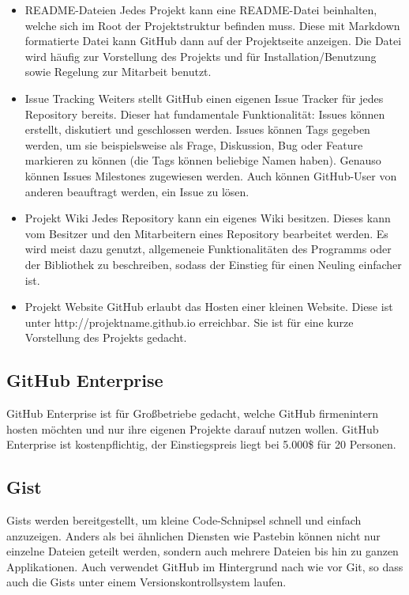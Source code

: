 \begin{itemize}
\item README-Dateien
Jedes Projekt kann eine README-Datei beinhalten, welche sich im Root der Projektstruktur befinden muss. Diese mit Markdown formatierte Datei kann GitHub dann auf der Projektseite anzeigen. Die Datei wird häufig zur Vorstellung des Projekts und für Installation/Benutzung sowie Regelung zur Mitarbeit benutzt.

\item Issue Tracking
Weiters stellt GitHub einen eigenen Issue Tracker für jedes Repository bereits. Dieser hat fundamentale Funktionalität: Issues können erstellt, diskutiert und geschlossen werden. Issues können Tags gegeben werden, um sie beispielsweise als Frage, Diskussion, Bug oder Feature markieren zu können (die Tags können beliebige Namen haben). Genauso können Issues Milestones zugewiesen werden. Auch können GitHub-User von anderen beauftragt werden, ein Issue zu lösen.

\item Projekt Wiki
Jedes Repository kann ein eigenes Wiki besitzen. Dieses kann vom Besitzer und den Mitarbeitern eines Repository bearbeitet werden. Es wird meist dazu genutzt, allgemeneie Funktionalitäten des Programms oder der Bibliothek zu beschreiben, sodass der Einstieg für einen Neuling einfacher ist.

\item Projekt Website
GitHub erlaubt das Hosten einer kleinen Website. Diese ist unter http://projektname.github.io erreichbar. Sie ist für eine kurze Vorstellung des Projekts gedacht.

\end{itemize}

\subsection{GitHub Enterprise}
GitHub Enterprise ist für Großbetriebe gedacht, welche GitHub firmenintern hosten möchten und nur ihre eigenen Projekte darauf nutzen wollen. GitHub Enterprise ist kostenpflichtig, der Einstiegspreis liegt bei 5.000\$ für 20 Personen.

\subsection{Gist}
Gists werden bereitgestellt, um kleine Code-Schnipsel schnell und einfach anzuzeigen. Anders als bei ähnlichen Diensten wie Pastebin können nicht nur einzelne Dateien geteilt werden, sondern auch mehrere Dateien bis hin zu ganzen Applikationen. Auch verwendet GitHub im Hintergrund nach wie vor Git, so dass auch die Gists unter einem Versionskontrollsystem laufen.

